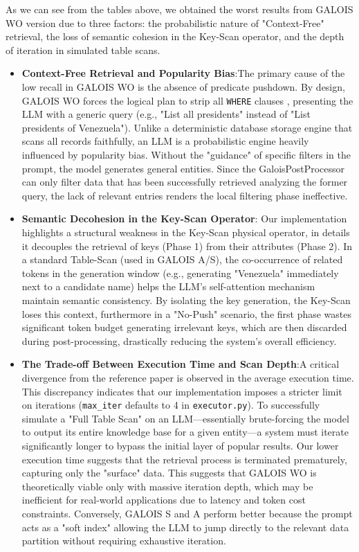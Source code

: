 As we can see from the tables above, we obtained the worst results from GALOIS WO version due to three factors:
the probabilistic nature of "Context-Free" retrieval, the loss of semantic cohesion in the Key-Scan operator, and the depth of iteration in simulated table scans.
\begin{itemize}
    \item \textbf{Context-Free Retrieval and Popularity Bias}:The primary cause of the low recall in GALOIS WO is the absence of predicate pushdown. By design, GALOIS WO forces the logical plan to strip all \texttt{WHERE} clauses , presenting the LLM with a generic query (e.g., "List all presidents" instead of "List presidents of Venezuela"). Unlike a deterministic database storage engine that scans all records faithfully, an LLM is a probabilistic engine heavily influenced by popularity bias. Without the "guidance" of specific filters in the prompt, the model generates general entities.
    Since the GaloisPostProcessor can only filter data that has been successfully retrieved analyzing the former query, the lack of relevant entries renders the local filtering phase ineffective.
    \item \textbf{Semantic Decohesion in the Key-Scan Operator}: Our implementation highlights a structural weakness in the Key-Scan physical operator, in details it decouples the retrieval of keys (Phase 1) from their attributes (Phase 2).
    In a standard Table-Scan (used in GALOIS A/S), the co-occurrence of related tokens in the generation window (e.g., generating "Venezuela" immediately next to a candidate name) helps the LLM's self-attention mechanism maintain semantic consistency.
    By isolating the key generation, the Key-Scan loses this context, furthermore in a "No-Push" scenario, the first phase wastes significant token budget generating irrelevant keys, which are then discarded during post-processing, drastically reducing the system's overall efficiency.
    \item \textbf{The Trade-off Between Execution Time and Scan Depth}:A critical divergence from the reference paper is observed in the average execution time.
    This discrepancy indicates that our implementation imposes a stricter limit on iterations (\texttt{max\_iter} defaults to 4 in \texttt{executor.py}). To successfully simulate a "Full Table Scan" on an LLM—essentially brute-forcing the model to output its entire knowledge base for a given entity—a system must iterate significantly longer to bypass the initial layer of popular results. Our lower execution time suggests that the retrieval process is terminated prematurely, capturing only the "surface" data.
    This suggests that GALOIS WO is theoretically viable only with massive iteration depth, which may be inefficient for real-world applications due to latency and token cost constraints.
    Conversely, GALOIS S and A perform better because the prompt acts as a "soft index" allowing the LLM to jump directly to the relevant data partition without requiring exhaustive iteration.
\end{itemize}